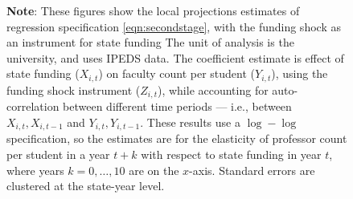 \begin{figure}[H]
\begin{subfigure}[b]{0.495\textwidth}
        \label{fig:all-count-lp}
    \end{subfigure}
    \label{fig:count-lp}
    \justify
    \footnotesize
    \textbf{Note}:
    These figures show the local projections estimates of regression specification \eqref{eqn:secondstage}, with the funding shock as an instrument for state funding
    The unit of analysis is the university, and uses IPEDS data.
    The coefficient estimate is effect of state funding ($X_{i,t}$) on faculty count per student ($Y_{i,t}$), using the funding shock instrument ($Z_{i,t}$), while accounting for auto-correlation between different time periods --- i.e., between $X_{i,t}, X_{i,t-1}$ and $Y_{i,t}, Y_{i,t-1}$.
    These results use a $\log-\log$ specification, so the estimates are for the elasticity of professor count per student in a year $t+k$ with respect to state funding in year $t$, where years $k = 0, \hdots, 10$ are on the $x$-axis. 
    Standard errors are clustered at the state-year level.
\end{figure}

